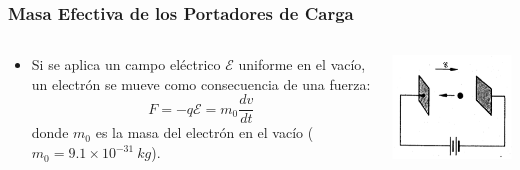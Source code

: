 \documentclass[10pt,t,aspectratio=169]{beamer}
\begin{document}
\begin{frame}[t]
  \frametitle{Masa Efectiva de los Portadores de Carga}

  \begin{columns}
  
    \begin{column}[]{0.8\textwidth}
    
      \begin{itemize}
        \item Si se aplica un campo eléctrico $\mathcal{E}$ uniforme en el vacío, un electrón se mueve como consecuencia de una fuerza:
        \[ F = -q\mathcal{E} = m_0 \dfrac{dv}{dt} \]
        donde $m_0$ es la masa del electrón en el vacío ($m_0=9.1\times{}10^{-31}\ kg$).
      \end{itemize}
      
    \end{column}
    
    \begin{column}[]{0.2\textwidth}
    
      \centering
      \includegraphics[width=\textwidth]{./figures/fuerza.png}
      
    \end{column}
    
  \end{columns}

  \vspace{3mm}
  \begin{columns}
  

\end{columns}
\end{frame}
\end{document}
